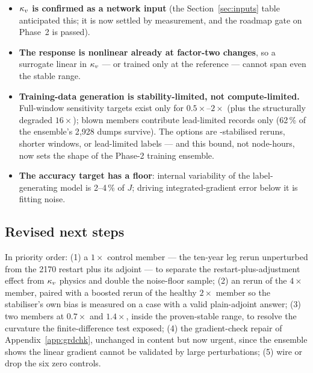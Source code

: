 \begin{itemize}[nosep]
  \item \textbf{$\kappa_{v}$ is confirmed as a network input} (the
        Section~\ref{sec:inputs} table anticipated this; it is now settled by
        measurement, and the roadmap gate on Phase~2 is passed).
  \item \textbf{The response is nonlinear already at factor-two changes}, so
        a surrogate linear in $\kappa_{v}$ --- or trained only at the reference ---
        cannot span even the stable range.
  \item \textbf{Training-data generation is stability-limited, not
        compute-limited.} Full-window sensitivity targets exist only for
        $0.5\times$--$2\times$ (plus the structurally degraded $16\times$);
        blown members contribute lead-limited records only (62\,\% of the
        ensemble's 2{,}928 dumps survive). The options are
        -stabilised reruns, shorter windows, or
        lead-limited labels --- and this bound, not node-hours, now sets the
        shape of the Phase-2 training ensemble.
  \item \textbf{The accuracy target has a floor}: internal variability of the
        label-generating model is 2--4\,\% of $J$; driving integrated-gradient
        error below it is fitting noise.
\end{itemize}

\subsection{Revised next steps}
\label{sec:results-next}

In priority order: (1) a $1\times$ control member --- the ten-year leg rerun
unperturbed from the 2170 restart plus its adjoint --- to separate the
restart-plus-adjustment effect from $\kappa_{v}$ physics and double the noise-floor
sample; (2) an  rerun of the $4\times$ member, paired with
a boosted rerun of the healthy $2\times$ member so the stabiliser's own bias is
measured on a case with a valid plain-adjoint answer; (3) two members at
$0.7\times$ and $1.4\times$, inside the proven-stable range, to resolve the
curvature the finite-difference test exposed; (4) the gradient-check repair of
Appendix~\ref{app:grdchk}, unchanged in content but now urgent, since the
ensemble shows the linear gradient cannot be validated by large perturbations;
(5) wire or drop the six zero controls.
